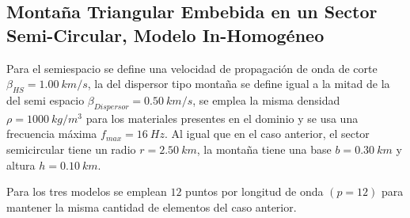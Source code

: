 \documentclass[spanish,letterpaper,12pt,twoside,openany]{article}
\begin{document}
\subsection{Montaña Triangular Embebida en un Sector Semi-Circular, Modelo In-Homogéneo}
%
Para el semiespacio se define una velocidad de propagación de onda de corte $\beta_{HS} = 1.00\ km/s$, la del dispersor tipo montaña se define igual a la mitad de la del semi espacio $\beta_{Dispersor} = 0.50\ km/s$, se emplea la misma densidad $\rho = 1000\ kg/m^3$ para los materiales presentes en el dominio y se usa una frecuencia máxima $f_{max} =  16\ Hz$. Al igual que en el caso anterior, el sector semicircular tiene un radio $r=2.50\ km$, la montaña tiene una base $b=0.30\ km$ y altura $h=0.10\ km$.

Para los tres modelos se emplean $12$ puntos por longitud de onda $\left( p = 12 \right)$ para mantener la misma cantidad de elementos del caso anterior.
\end{document}
